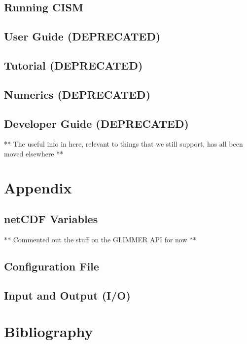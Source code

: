 \chapter{Running CISM}
\renewcommand{\dir}{run_cism}



\chapter{User Guide (DEPRECATED)}
\renewcommand{\dir}{ug}


\chapter{Tutorial (DEPRECATED)}
\renewcommand{\dir}{tut}



\chapter{Numerics (DEPRECATED)}
\renewcommand{\dir}{num}


\chapter{Developer Guide (DEPRECATED)}
** The useful info in here, relevant to things that we still support, has all been moved elsewhere **
%

%

\part{Appendix}
\appendix
\renewcommand{\dir}{ug}
\chapter{netCDF Variables}

** Commented out the stuff on the GLIMMER API for now **
%
%
%
\renewcommand{\dir}{ext}


\chapter{Configuration File}
\renewcommand{\dir}{dg}


\chapter{Input and Output (I/O)}


\part{Bibliography}


